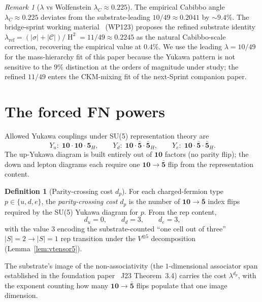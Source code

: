 \documentclass[11pt,reqno]{amsart}
\theoremstyle{plain}
\theoremstyle{definition}
\newtheorem{definition}[theorem]{Definition}
\theoremstyle{remark}
\newtheorem*{remark}{Remark}
\DeclareMathOperator{\HARM}{H}    %
\newcommand{\Cfour}{\mathcal{C}}  %
\newcommand{\rep}[1]{\mathbf{#1}}
\newcommand{\barrep}[1]{\bar{\mathbf{#1}}}
\begin{document}
\begin{remark}[$\lambda$ vs Wolfenstein $\lambda_{C} \approx 0.225$]\label{rem:lambda}
The empirical Cabibbo angle $\lambda_{C} \approx 0.225$ deviates
from the substrate-leading $10/49 \approx 0.2041$ by $\sim
9.4\%$. The bridge-sprint working
material~\cite{SandersClaudeChat2026BridgeSprint} (WP123)
proposes the refined substrate identity $\lambda_{\mathrm{ref}} =
(|\sigma| + |\Cfour|)/\HARM^{2} = 11/49 \approx 0.2245$ as the
natural Cabibbo-scale correction, recovering the empirical
value at $0.4\%$. We use the leading $\lambda = 10/49$ for the
mass-hierarchy fit of this paper because the Yukawa pattern is
not sensitive to the $9\%$ distinction at the orders of
magnitude under study; the refined $11/49$ enters the CKM-mixing
fit of the next-Sprint companion paper.
\end{remark}

\section{The forced FN powers}\label{sec:powers}

Allowed Yukawa couplings under SU(5) representation theory are
\[
  Y_{u}\colon\; \rep{10} \cdot \rep{10} \cdot \rep{5}_{H},\qquad
  Y_{d}\colon\; \rep{10} \cdot \barrep{5} \cdot \barrep{5}_{H},\qquad
  Y_{e}\colon\; \rep{10} \cdot \barrep{5} \cdot \barrep{5}_{H}.
\]
The up-Yukawa diagram is built entirely out of $\rep{10}$
factors (no parity flip); the down and lepton diagrams each
require one $\rep{10} \to \barrep{5}$ flip from the
representation content.

\begin{definition}[Parity-crossing cost $d_{p}$]\label{def:dp}
For each charged-fermion type $p \in \{u, d, e\}$, the
\emph{parity-crossing cost} $d_{p}$ is the number of $\rep{10}
\to \barrep{5}$ index flips required by the SU(5) Yukawa
diagram for $p$. From the rep content,
\[
  d_{u} = 0,\qquad d_{d} = 3,\qquad d_{e} = 3,
\]
with the value $3$ encoding the substrate-counted ``one cell
out of three'' $|S|=2 \to |S|=1$ rep transition under the
$V^{\otimes 5}$ decomposition (Lemma~\ref{lem:vtensor5}).
\end{definition}

The substrate's image of the non-associativity (the
$1$-dimensional associator span established in the foundation
paper~\cite{SandersJohnson2026DiscreteDirac} J23
Theorem~3.4) carries the cost $\lambda^{d_{p}}$, with the
exponent counting how many $\rep{10} \to \barrep{5}$ flips
populate that one image dimension.
\end{document}
